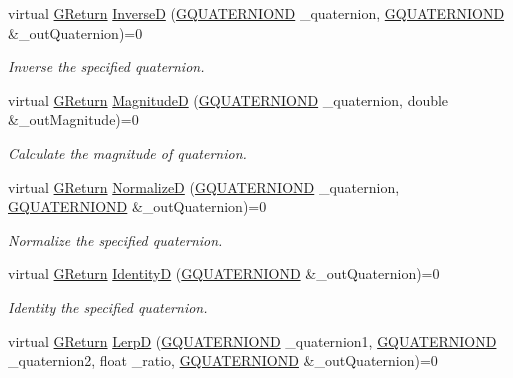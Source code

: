 \begin{DoxyCompactItemize}
virtual \hyperlink{namespaceGW_a67a839e3df7ea8a5c5686613a7a3de21}{G\+Return} \hyperlink{classGW_1_1MATH_1_1GQuaternion_ac2203e68f46ae2ea0ccc185fe34c446e}{InverseD} (\hyperlink{structGW_1_1MATH_1_1GQUATERNIOND}{G\+Q\+U\+A\+T\+E\+R\+N\+I\+O\+ND} \+\_\+quaternion, \hyperlink{structGW_1_1MATH_1_1GQUATERNIOND}{G\+Q\+U\+A\+T\+E\+R\+N\+I\+O\+ND} \&\+\_\+out\+Quaternion)=0
\begin{DoxyCompactList}\small\item\em Inverse the specified quaternion. \end{DoxyCompactList}\item 
virtual \hyperlink{namespaceGW_a67a839e3df7ea8a5c5686613a7a3de21}{G\+Return} \hyperlink{classGW_1_1MATH_1_1GQuaternion_a4f7486a44ec31235fe98a5ac306b3595}{MagnitudeD} (\hyperlink{structGW_1_1MATH_1_1GQUATERNIOND}{G\+Q\+U\+A\+T\+E\+R\+N\+I\+O\+ND} \+\_\+quaternion, double \&\+\_\+out\+Magnitude)=0
\begin{DoxyCompactList}\small\item\em Calculate the magnitude of quaternion. \end{DoxyCompactList}\item 
virtual \hyperlink{namespaceGW_a67a839e3df7ea8a5c5686613a7a3de21}{G\+Return} \hyperlink{classGW_1_1MATH_1_1GQuaternion_aee972e9eadcb9656153e3a6b218e5aa9}{NormalizeD} (\hyperlink{structGW_1_1MATH_1_1GQUATERNIOND}{G\+Q\+U\+A\+T\+E\+R\+N\+I\+O\+ND} \+\_\+quaternion, \hyperlink{structGW_1_1MATH_1_1GQUATERNIOND}{G\+Q\+U\+A\+T\+E\+R\+N\+I\+O\+ND} \&\+\_\+out\+Quaternion)=0
\begin{DoxyCompactList}\small\item\em Normalize the specified quaternion. \end{DoxyCompactList}\item 
virtual \hyperlink{namespaceGW_a67a839e3df7ea8a5c5686613a7a3de21}{G\+Return} \hyperlink{classGW_1_1MATH_1_1GQuaternion_a794efffc63a56778e810246cfaabb692}{IdentityD} (\hyperlink{structGW_1_1MATH_1_1GQUATERNIOND}{G\+Q\+U\+A\+T\+E\+R\+N\+I\+O\+ND} \&\+\_\+out\+Quaternion)=0
\begin{DoxyCompactList}\small\item\em Identity the specified quaternion. \end{DoxyCompactList}\item 
virtual \hyperlink{namespaceGW_a67a839e3df7ea8a5c5686613a7a3de21}{G\+Return} \hyperlink{classGW_1_1MATH_1_1GQuaternion_a8babbec6378f12ecd2b7ae5d6e1b64fa}{LerpD} (\hyperlink{structGW_1_1MATH_1_1GQUATERNIOND}{G\+Q\+U\+A\+T\+E\+R\+N\+I\+O\+ND} \+\_\+quaternion1, \hyperlink{structGW_1_1MATH_1_1GQUATERNIOND}{G\+Q\+U\+A\+T\+E\+R\+N\+I\+O\+ND} \+\_\+quaternion2, float \+\_\+ratio, \hyperlink{structGW_1_1MATH_1_1GQUATERNIOND}{G\+Q\+U\+A\+T\+E\+R\+N\+I\+O\+ND} \&\+\_\+out\+Quaternion)=0

\end{DoxyCompactItemize}
